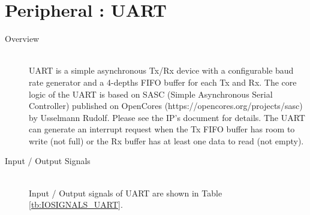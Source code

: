 \section{Peripheral : UART}

\begin{description}

    \item[Overview]\mbox{}\\
        UART is a simple asynchronous Tx/Rx device with a configurable baud rate generator and a 4-depths FIFO buffer for each Tx and Rx. The core logic of the UART is based on SASC (Simple Asynchronous Serial Controller) published on OpenCores (https://opencores.org/projects/sasc) by Usselmann Rudolf. Please see the IP’s document for details. The UART can generate an interrupt request when the Tx FIFO buffer has room to write (not full) or the Rx buffer has at least one data to read (not empty).

    \item[Input / Output Signals]\mbox{}\\
        Input / Output signals of UART are shown in Table \ref{tb:IOSIGNALS_UART}.


\end{description}
